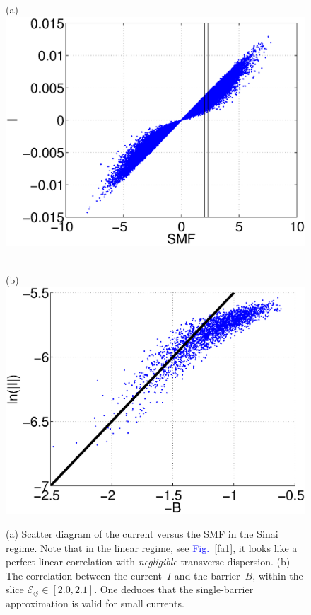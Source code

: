 \documentclass[aps,pre,floats,floatfix,twocolumn]{revtex4}
\newcommand{\Fig}[1]{\textcolor{blue}{Fig.}\!\!~\ref{#1}}
\begin{document}
\begin{figure}

\hspace*{-10mm} (a) \\
\includegraphics[width=0.8\hsize]{IvsSMF2}

\ \\

\hspace*{-10mm} (b) \\
\includegraphics[width=0.8\hsize]{BvsLnI.eps}

\caption{(a) Scatter diagram of the current versus the SMF in the Sinai regime.
Note that in the linear regime, see \Fig{fa1}, it looks like a perfect linear 
correlation with {\em negligible} transverse dispersion.  
(b) The correlation between the current~$I$ and the barrier~$B$,  
within the slice ${\mathcal{E}_{\circlearrowleft} \in [2.0,2.1]}$. 
One deduces that the single-barrier approximation is valid for small currents.}

\label{f4}
\end{figure}
\end{document}
